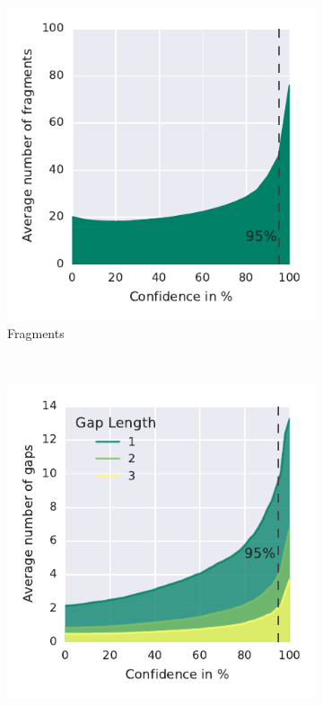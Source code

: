 \begin{figure}
    \centering
    \begin{subfigure}[b]{0.45\textwidth}
        \includegraphics[width=\textwidth]{Figures/fragments}
        \caption[Average Number of Fragments]{Fragments}
        \label{fig:fragments}
    \end{subfigure}
    ~ %
    \begin{subfigure}[b]{0.45\textwidth}
        \includegraphics[width=\textwidth]{Figures/gaps}

\end{subfigure}
\end{figure}

